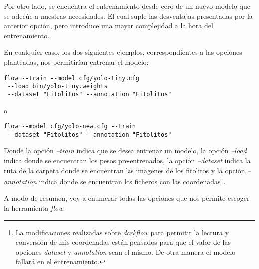 Por otro lado, se encuentra el entrenamiento desde cero de un nuevo modelo que se adecúe a nuestras necesidades. El cual suple las desventajas presentadas por la anterior opción, pero introduce una mayor complejidad a la hora del entrenamiento.

En cualquier caso, los dos siguientes ejemplos, correspondientes a las opciones planteadas, nos permitirían entrenar el modelo:

\begin{verbatim}
flow --train --model cfg/yolo-tiny.cfg
 --load bin/yolo-tiny.weights
 --dataset "Fitolitos" --annotation "Fitolitos"
\end{verbatim}

o

\begin{verbatim}
flow --model cfg/yolo-new.cfg --train
 --dataset "Fitolitos" --annotation "Fitolitos"
\end{verbatim}

Donde la opción \textit{--train} indica que se desea entrenar un modelo, la opción \textit{--load} indica donde se encuentran los pesos pre-entrenados, la opción \textit{--dataset} indica la ruta de la carpeta donde se encuentran las imagenes de los fitolitos y la opción \textit{--annotation} indica donde se encuentran los ficheros con las coordenadas\footnote{La modificaciones realizadas sobre \href{https://github.com/thtrieu/darkflow}{\textit{darkflow}} para permitir la lectura y conversión de mis coordenadas están pensados para que el valor de las opciones \textit{dataset} y \textit{annotation} sean el mismo. De otra manera el modelo fallará en el entrenamiento.}.

A modo de resumen, voy a enumerar todas las opciones que nos permite escoger la herramienta \textit{flow}:

